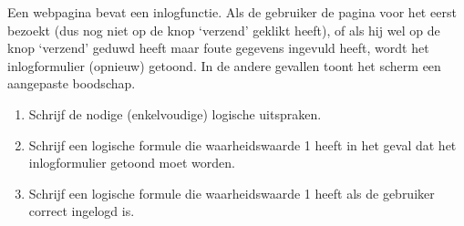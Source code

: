 \begin{oef}
 Een webpagina bevat een inlogfunctie. Als de gebruiker de pagina voor het eerst bezoekt (dus nog niet op de knop `verzend' geklikt heeft), of als hij wel op de knop `verzend' geduwd heeft maar foute gegevens ingevuld heeft, wordt het inlogformulier (opnieuw) getoond. In de andere gevallen toont het scherm een aangepaste boodschap. 
\begin{enumerate}
\item Schrijf de nodige (enkelvoudige) logische uitspraken.
\item Schrijf een logische formule die waarheidswaarde 1 heeft in het geval dat het inlogformulier getoond moet worden.
\item Schrijf een logische formule die waarheidswaarde 1 heeft als de gebruiker correct ingelogd is.
\end{enumerate}

\end{oef}

